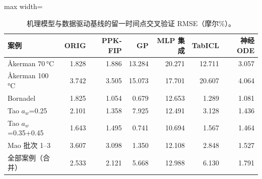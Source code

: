 \begin{table}[t]
\centering
\caption{机理模型与数据驱动基线的留一时间点交叉验证 RMSE（摩尔\%）。}\label{tab:lotobb}
\footnotesize
\begin{adjustbox}{max width=\linewidth}
\begin{tabular}{lrrrrrr}
\toprule
案例 & ORIG & PPK-FIP & GP & MLP 集成 & TabICL & 神经 ODE \\
\midrule
Åkerman 70\,°C & 1.828 & 1.886 & 13.284 & 20.271 & 12.711 & 3.057 \\
Åkerman 100\,°C & 3.742 & 3.505 & 15.073 & 17.701 & 20.607 & 4.064 \\
Bornadel & 1.825 & 1.054 & 0.679 & 12.653 & 1.289 & 1.081 \\
Tao $a_w$=0.25 & 2.101 & 1.358 & 7.925 & 12.491 & 3.128 & 1.436 \\
Tao $a_w$=0.35+0.45 & 1.643 & 1.495 & 0.741 & 10.694 & 1.567 & 1.464 \\
Mao 批次 1--3 & 3.607 & 3.098 & 1.350 & 12.108 & 2.848 & 1.527 \\
\midrule
全部案例（合并） & 2.533 & 2.121 & 5.668 & 12.988 & 6.130 & 1.791 \\
\bottomrule
\end{tabular}
\end{adjustbox}
\end{table}
